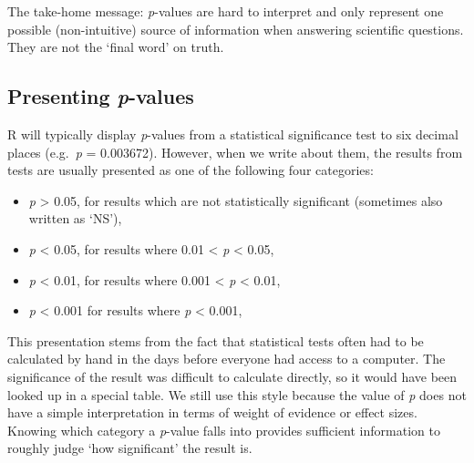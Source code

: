 \documentclass[
]{book}
\begin{document}
The take-home message: \emph{p}-values are hard to interpret and only represent one possible (non-intuitive) source of information when answering scientific questions. They are not the `final word' on truth.

\hypertarget{presenting-p-values}{%
\subsection{\texorpdfstring{Presenting \emph{p}-values}{Presenting p-values}}\label{presenting-p-values}}

R will typically display \emph{p}-values from a statistical significance test to six decimal places (e.g.~\emph{p} = 0.003672). However, when we write about them, the results from tests are usually presented as one of the following four categories:

\begin{itemize}
\item
  \emph{p} \textgreater{} 0.05, for results which are not statistically significant (sometimes also written as `NS'),
\item
  \emph{p} \textless{} 0.05, for results where 0.01 \textless{} \emph{p} \textless{} 0.05,
\item
  \emph{p} \textless{} 0.01, for results where 0.001 \textless{} \emph{p} \textless{} 0.01,
\item
  \emph{p} \textless{} 0.001 for results where \emph{p} \textless{} 0.001,
\end{itemize}

This presentation stems from the fact that statistical tests often had to be calculated by hand in the days before everyone had access to a computer. The significance of the result was difficult to calculate directly, so it would have been looked up in a special table. We still use this style because the value of \emph{p} does not have a simple interpretation in terms of weight of evidence or effect sizes. Knowing which category a \emph{p}-value falls into provides sufficient information to roughly judge `how significant' the result is.
\end{document}
